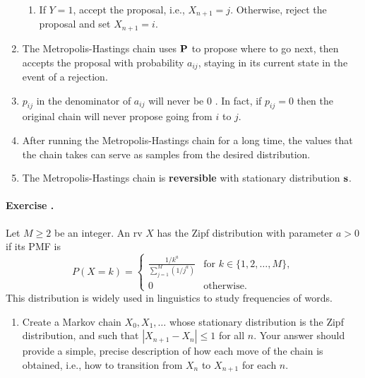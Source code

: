 \documentclass[twocolumn,12pt,a4paper]{article}
\newcommand{\bP}{\bold P}
\newcommand{\bs}{\bold s}
\newcounter{num}  %
\begin{document}
\begin{enumerate}
\begin{enumerate}
		\item If $Y=1$, accept the proposal, i.e., $X_{n+1} = j$. Otherwise, reject the proposal and set \( X_{n+1} = i \).
	\end{enumerate}
	\item The Metropolis-Hastings chain uses $\bP$ to propose where to go next, then accepts the proposal with probability \( a_{ij} \), staying in its current state in the event of a rejection.
	
	\item  \( p_{ij} \) in the denominator of \( a_{ij} \) will never be 0 .
	In fact, if \( p_{ij} = 0 \) then the original chain will never propose going from \( i \) to \( j \). 
	
	\item After running the Metropolis-Hastings chain for a long time, the values that the chain takes can serve as samples from the desired distribution.
	
	\item The Metropolis-Hastings chain is \textbf{reversible} with stationary distribution \( \bs \).
	
\end{enumerate}


\paragraph{Exercise \thenum.}
Let $M \geq 2$ be an integer. An rv $X$ has the Zipf distribution with parameter $a > 0$ if its PMF is
\[
P(X = k) = 
\begin{cases}
	\displaystyle \frac{1/k^a}{\sum_{j=1}^M (1/j^a)} & \text{for } k \in \{1, 2, \ldots, M\}, \\
	0 & \text{otherwise}.
\end{cases}
\]
This distribution is widely used in linguistics to study frequencies of words.
\begin{enumerate}
	\item 
	Create a Markov chain $X_0, X_1, \ldots$ whose stationary distribution is the Zipf distribution, and such that $|X_{n+1} - X_n| \leq 1$ for all $n$. Your answer should provide a simple, precise description of how each move of the chain is obtained, i.e., how to transition from $X_n$ to $X_{n+1}$ for each $n$.
\end{enumerate}
\end{document}
